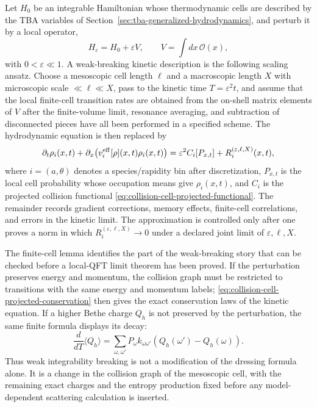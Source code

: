 \begin{controlledapproximation}
\label{ca:weak-breaking-kinetic-scaling}
Let \(H_0\) be an integrable Hamiltonian whose thermodynamic cells are
described by the TBA variables of Section~\ref{sec:tba-generalized-hydrodynamics},
and perturb it by a local operator,
\[
  H_\varepsilon=H_0+\varepsilon V,
  \qquad
  V=\int dx\,\mathcal O(x),
\]
with \(0<\varepsilon\ll1\).  A weak-breaking kinetic description is the
following scaling ansatz.  Choose a mesoscopic cell length \(\ell\) and a
macroscopic length \(X\) with microscopic scale \(\ll\ell\ll X\), pass to the
kinetic time \(T=\varepsilon^2t\), and assume that the local finite-cell
transition rates are obtained from the on-shell matrix elements of \(V\) after
the finite-volume limit, resonance averaging, and subtraction of disconnected
pieces have all been performed in a specified scheme.  The hydrodynamic
equation is then replaced by
\begin{equation}
  \partial_t\rho_i(x,t)
  +
  \partial_x\!\left(v_i^{\rm eff}[\rho](x,t)\rho_i(x,t)\right)
  =
  \varepsilon^2 C_i[P_{x,t}]
  +
  R_i^{(\varepsilon,\ell,X)}(x,t),
  \label{eq:weak-breaking-kinetic-ghd}
\end{equation}
where \(i=(a,\theta)\) denotes a species/rapidity bin after discretization,
\(P_{x,t}\) is the local cell probability whose occupation means give
\(\rho_i(x,t)\), and \(C_i\) is the projected collision functional
\eqref{eq:collision-cell-projected-functional}.  The remainder records
gradient corrections, memory effects, finite-cell correlations, and errors in
the kinetic limit.  The approximation is controlled only after one proves a
norm in which \(R_i^{(\varepsilon,\ell,X)}\to0\) under a declared joint limit
of \(\varepsilon,\ell,X\).
\end{controlledapproximation}

The finite-cell lemma identifies the part of the weak-breaking story that can
be checked before a local-QFT limit theorem has been proved.  If the
perturbation preserves energy and momentum, the collision graph must be
restricted to transitions
with the same energy and momentum labels; \eqref{eq:collision-cell-projected-conservation}
then gives the exact conservation laws of the kinetic equation.  If a higher
Bethe charge \(Q_h\) is not preserved by the perturbation, the same finite
formula displays its decay:
\[
  \frac{d}{dT}\langle Q_h\rangle
  =
  \sum_{\omega,\omega'}
  P_\omega k_{\omega\omega'}
  \left(Q_h(\omega')-Q_h(\omega)\right).
\]
Thus weak integrability breaking is not a modification of the dressing
formula alone.  It is a change in the collision graph of the mesoscopic cell,
with the remaining exact charges and the entropy production fixed before any
model-dependent scattering calculation is inserted.

